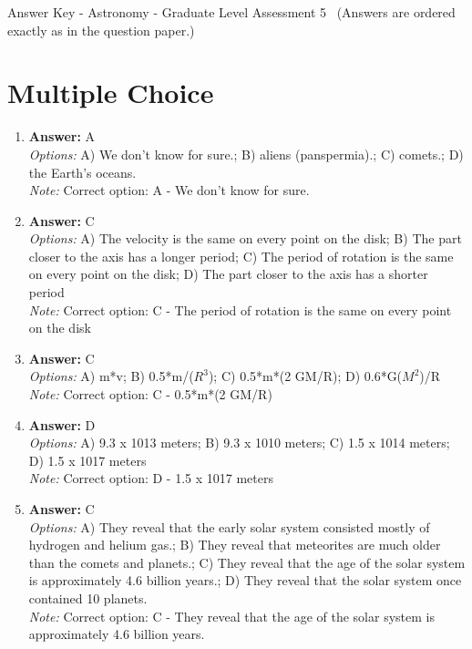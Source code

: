\documentclass[12pt]{article}
\begin{document}
\begin{center}
Answer Key - Astronomy - Graduate Level Assessment 5 \
\small (Answers are ordered exactly as in the question paper.)
\end{center}

\section*{Multiple Choice}
\begin{enumerate}[label=\arabic*.]
\item \textbf{Answer:} A
\\ \textit{Options:} A) We don't know for sure.; B) aliens (panspermia).; C) comets.; D) the Earth's oceans.
\\ \textit{Note:} Correct option: A - We don't know for sure.
\item \textbf{Answer:} C
\\ \textit{Options:} A) The velocity is the same on every point on the disk; B) The part closer to the axis has a longer period; C) The period of rotation is the same on every point on the disk; D) The part closer to the axis has a shorter period
\\ \textit{Note:} Correct option: C - The period of rotation is the same on every point on the disk
\item \textbf{Answer:} C
\\ \textit{Options:} A) m*v; B) 0.5*m/($R^3$); C) 0.5*m*(2 GM/R); D) 0.6*G($M^2$)/R
\\ \textit{Note:} Correct option: C - 0.5*m*(2 GM/R)
\item \textbf{Answer:} D
\\ \textit{Options:} A) 9.3 x 1013 meters; B) 9.3 x 1010 meters; C) 1.5 x 1014 meters; D) 1.5 x 1017 meters
\\ \textit{Note:} Correct option: D - 1.5 x 1017 meters
\item \textbf{Answer:} C
\\ \textit{Options:} A) They reveal that the early solar system consisted mostly of hydrogen and helium gas.; B) They reveal that meteorites are much older than the comets and planets.; C) They reveal that the age of the solar system is approximately 4.6 billion years.; D) They reveal that the solar system once contained 10 planets.
\\ \textit{Note:} Correct option: C - They reveal that the age of the solar system is approximately 4.6 billion years.
\end{enumerate}
\end{document}
